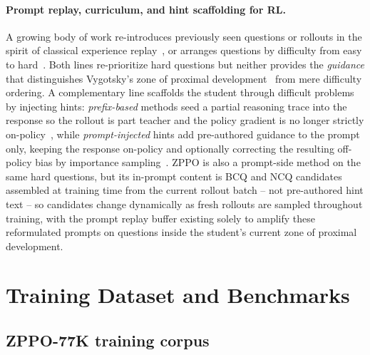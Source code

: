 \documentclass{llmxive}
\begin{document}
\paragraph{Prompt replay, curriculum, and hint scaffolding for RL.}
A growing body of work re-introduces previously seen questions or rollouts in the spirit of classical experience replay~\citep{zhan2025exgrpo,zhang2025rlep,li2025repo,li2026dyjr,baroian2026prompt}, or arranges questions by difficulty from easy to hard~\citep{zhang2025clpo,mahrooghi2026goldilocks}. Both lines re-prioritize hard questions but neither provides the \emph{guidance} that distinguishes Vygotsky's zone of proximal development~\citep{vygotsky1978mind} from mere difficulty ordering. A complementary line scaffolds the student through difficult problems by injecting hints: \emph{prefix-based} methods seed a partial reasoning trace into the response so the rollout is part teacher and the policy gradient is no longer strictly on-policy~\citep{zhang2025stephint,zhang2025bread,liu2026palign}, while \emph{prompt-injected} hints add pre-authored guidance to the prompt only, keeping the response on-policy and optionally correcting the resulting off-policy bias by importance sampling~\citep{li2025staying,nath2025adaptive}. ZPPO is also a prompt-side method on the same hard questions, but its in-prompt content is BCQ and NCQ candidates assembled at training time from the current rollout batch -- not pre-authored hint text -- so candidates change dynamically as fresh rollouts are sampled throughout training, with the prompt replay buffer existing solely to amplify these reformulated prompts on questions inside the student's current zone of proximal development.


\section{Training Dataset and Benchmarks}
\label{sec:appendix:dataset}

\subsection{ZPPO-77K training corpus}
\label{sec:appendix:dataset:corpus}
\end{document}
